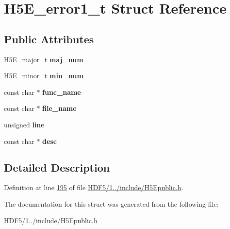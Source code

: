 \hypertarget{struct_h5_e__error1__t}{}\section{H5\+E\+\_\+error1\+\_\+t Struct Reference}
\label{struct_h5_e__error1__t}
\subsection*{Public Attributes}
\begin{DoxyCompactItemize}
\item 
\mbox{\label{struct_h5_e__error1__t_afa9f1b3a05b895f01e9f3ab56cf708e9}} 
H5\+E\+\_\+major\+\_\+t {\bfseries maj\+\_\+num}
\item 
\mbox{\label{struct_h5_e__error1__t_a6a240b744b0f18d4fdb3c9c5d0062b36}} 
H5\+E\+\_\+minor\+\_\+t {\bfseries min\+\_\+num}
\item 
\mbox{\label{struct_h5_e__error1__t_a017f7a23570d0c3289a2e88fc342e360}} 
const char $\ast$ {\bfseries func\+\_\+name}
\item 
\mbox{\label{struct_h5_e__error1__t_aea3e40720e5d0671c035b71869077bbd}} 
const char $\ast$ {\bfseries file\+\_\+name}
\item 
\mbox{\label{struct_h5_e__error1__t_aac42d5287c02732dba70ee615ea7ef3c}} 
unsigned {\bfseries line}
\item 
\mbox{\label{struct_h5_e__error1__t_ad3b4e11e3f32d59b32ad3d31e2daf6e5}} 
const char $\ast$ {\bfseries desc}
\end{DoxyCompactItemize}


\subsection{Detailed Description}


Definition at line \hyperlink{_h_d_f5_21_810_81_2include_2_h5_epublic_8h_source_l00195}{195} of file \hyperlink{_h_d_f5_21_810_81_2include_2_h5_epublic_8h_source}{H\+D\+F5/1../include/\+H5\+Epublic.\+h}.



The documentation for this struct was generated from the following file\+:\begin{DoxyCompactItemize}
\item 
H\+D\+F5/1../include/\+H5\+Epublic.\+h\end{DoxyCompactItemize}
